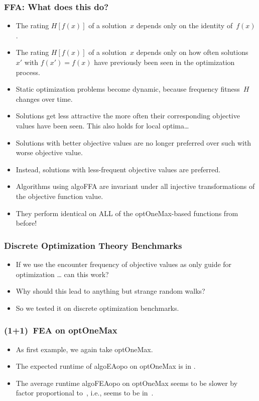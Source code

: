 \documentclass[aspectratio=169,mathserif,notheorems]{beamer}%
\begin{document}
\begin{frame}%
\frametitle{FFA: What does this do?}%
\begin{itemize}%
\item The rating $H[f(x)]$ of a solution~$x$ depends only on the identity of~$f(x)$.
\item<2-> The rating $H[f(x)]$ of a solution~$x$ depends only on how often solutions~$x'$ with $f(x')=f(x)$ have previously been seen in the optimization process.%
\item<3-> Static optimization problems become dynamic, because frequency fitness~$H$ changes over time.%
\item<4-> Solutions get less attractive the more often their corresponding objective values have been seen. This also holds for local optima\dots%
\item<5-> Solutions with better objective values are no longer preferred over such with worse objective value.%
\item<6-> Instead, solutions with less-frequent objective values are preferred.%
\item<7-> \alert{Algorithms using \gls{algoFFA} are invariant under all injective transformations of the objective function value.}%
\item<8-> \alert{They perform identical on ALL of the \gls{optOneMax}-based functions from before!}%
\end{itemize}%
\end{frame}%
%
\begin{frame}[t]%
\frametitle{Discrete Optimization Theory Benchmarks}%
\begin{itemize}%
\item If we use the encounter frequency of objective values as \alert{only} guide for optimization {\dots} can this work?%
\item<2-> Why should this lead to anything but strange random walks?%
\item<3-> So we tested it on discrete optimization benchmarks.%
\end{itemize}%
%
%
\end{frame}%
%
\begin{frame}%
\frametitle{(1+1)~FEA on \gls{optOneMax}}%
\parbox{0.37\paperwidth}{%
\begin{itemize}%
\item As first example, we again take \gls{optOneMax}\cite{M1992HGARWMAH}.%
\item<2-> The expected runtime of \gls{algoEAopo} on \gls{optOneMax} is in \bigThetab{\scale\ln{\scale}}\cite{DDE2015FBBCTDNGA,M1992HGARWMAH}.%
\item<3-> The average runtime \gls{algoFEAopo} on \gls{optOneMax} seems to be slower by factor proportional to~\scale, i.e., seems to be in~\bigOb{\scale^2\ln{\scale}}\cite{WWLC2021FFAMOAIUBTOTOFV}.%
\end{itemize}%
}%
%
%
%
\end{frame}%
\end{document}
